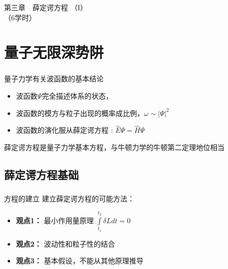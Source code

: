 \begin{frame}
		\frametitle{}
	    \begin{center}
		{ {\Huge 第三章~~薛定谔方程 （I）\\（6学时）}}
	    \end{center}    
\end{frame}

\section{量子无限深势阱}
\begin{frame}
	\frametitle{}  
	\begin{block}	{量子力学有关波函数的基本结论}
	\begin{itemize}
		\item 	波函数$\Psi$完全描述体系的状态，
		\item 	波函数的模方与粒子出现的概率成比例，$\omega \sim |\Psi|^2$
		\item 	波函数的演化服从薛定谔方程 : $\hat{E} \Psi = \hat{H}  \Psi $ 
	\end{itemize}
	薛定谔方程是量子力学基本方程，与牛顿力学的牛顿第二定理地位相当
	\end{block}	
\end{frame}

\subsection{薛定谔方程基础}
\begin{frame}
	\frametitle{}
	\begin{alertblock} {方程的建立}  
		建立薛定谔方程的可能方法：\\
		\begin{itemize}
			\item 	\textbf{ 观点1：}  最小作用量原理 $\int\limits_{t_1}^{t_2} \delta L d t =0 $\\ 
			\item 	\textbf{ 观点2：}  波动性和粒子性的结合\\ 
			\item 	\textbf{ 观点3：}  基本假设，不能从其他原理推导 \\
		\end{itemize}
	\end{alertblock}
\end{frame}

